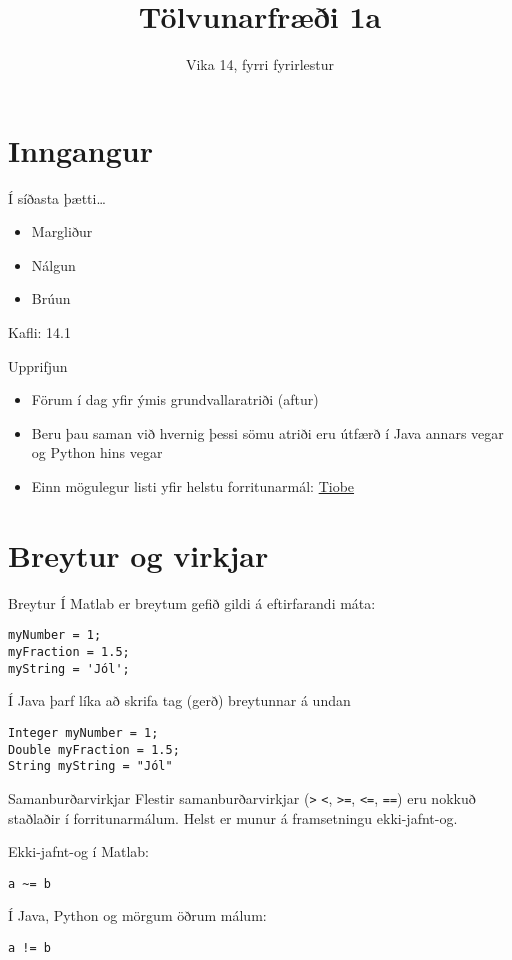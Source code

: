 \documentclass{beamer}
\title{Tölvunarfræði 1a}
\subtitle{Vika 14, fyrri fyrirlestur}
\begin{document}
\begin{frame}
\titlepage
\end{frame}

\section{Inngangur}

\begin{frame}{Í síðasta þætti\ldots}
\begin{itemize}
 \item Margliður
 \item Nálgun
 \item Brúun
\end{itemize}
Kafli: 14.1
\end{frame}

\begin{frame}{Upprifjun}
\begin{itemize}
 \item Förum í dag yfir ýmis grundvallaratriði (aftur)
 \item Beru þau saman við hvernig þessi sömu atriði eru útfærð í Java annars vegar og Python hins vegar
 \item Einn mögulegur listi yfir helstu forritunarmál: \href{http://www.tiobe.com/index.php/content/paperinfo/tpci/index.html}{Tiobe}
\end{itemize}
\end{frame}


\section{Breytur og virkjar}

\begin{frame}[fragile]{Breytur}
\vspace{1cm}
Í Matlab er breytum gefið gildi á eftirfarandi máta:
\begin{verbatim}
myNumber = 1;
myFraction = 1.5;
myString = 'Jól';
\end{verbatim}
Í Java þarf líka að skrifa tag (gerð) breytunnar á undan 
\begin{verbatim}
Integer myNumber = 1;
Double myFraction = 1.5;
String myString = "Jól"
\end{verbatim}
\end{frame}

\begin{frame}[fragile]{Samanburðarvirkjar}
Flestir samanburðarvirkjar (\texttt{>} \texttt{<}, \texttt{>=}, \texttt{<=}, \texttt{==}) eru nokkuð staðlaðir í forritunarmálum. Helst er munur á framsetningu ekki-jafnt-og.

Ekki-jafnt-og í Matlab:
\begin{verbatim}
a ~= b
\end{verbatim}

Í Java, Python og mörgum öðrum málum:
\begin{verbatim}
a != b
\end{verbatim}
\end{frame}
\end{document}
